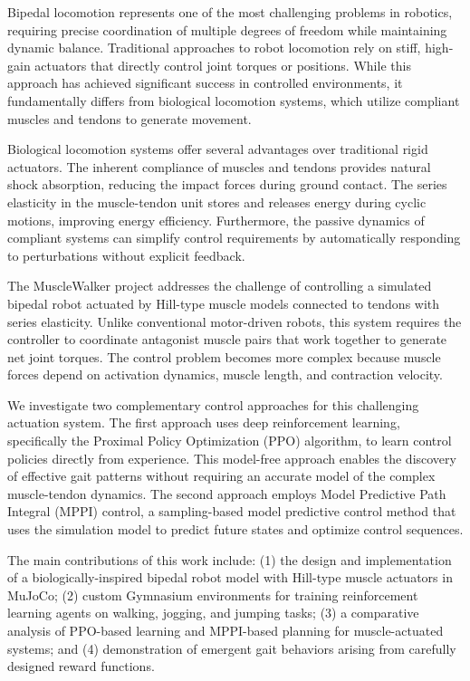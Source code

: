 \documentclass[conference]{IEEEtran}
\begin{document}
Bipedal locomotion represents one of the most challenging problems in robotics, requiring precise coordination of multiple degrees of freedom while maintaining dynamic balance. Traditional approaches to robot locomotion rely on stiff, high-gain actuators that directly control joint torques or positions. While this approach has achieved significant success in controlled environments, it fundamentally differs from biological locomotion systems, which utilize compliant muscles and tendons to generate movement.

Biological locomotion systems offer several advantages over traditional rigid actuators. The inherent compliance of muscles and tendons provides natural shock absorption, reducing the impact forces during ground contact. The series elasticity in the muscle-tendon unit stores and releases energy during cyclic motions, improving energy efficiency. Furthermore, the passive dynamics of compliant systems can simplify control requirements by automatically responding to perturbations without explicit feedback.

The MuscleWalker project addresses the challenge of controlling a simulated bipedal robot actuated by Hill-type muscle models connected to tendons with series elasticity. Unlike conventional motor-driven robots, this system requires the controller to coordinate antagonist muscle pairs that work together to generate net joint torques. The control problem becomes more complex because muscle forces depend on activation dynamics, muscle length, and contraction velocity.

We investigate two complementary control approaches for this challenging actuation system. The first approach uses deep reinforcement learning, specifically the Proximal Policy Optimization (PPO) algorithm, to learn control policies directly from experience. This model-free approach enables the discovery of effective gait patterns without requiring an accurate model of the complex muscle-tendon dynamics. The second approach employs Model Predictive Path Integral (MPPI) control, a sampling-based model predictive control method that uses the simulation model to predict future states and optimize control sequences.

The main contributions of this work include: (1) the design and implementation of a biologically-inspired bipedal robot model with Hill-type muscle actuators in MuJoCo; (2) custom Gymnasium environments for training reinforcement learning agents on walking, jogging, and jumping tasks; (3) a comparative analysis of PPO-based learning and MPPI-based planning for muscle-actuated systems; and (4) demonstration of emergent gait behaviors arising from carefully designed reward functions.
\end{document}
